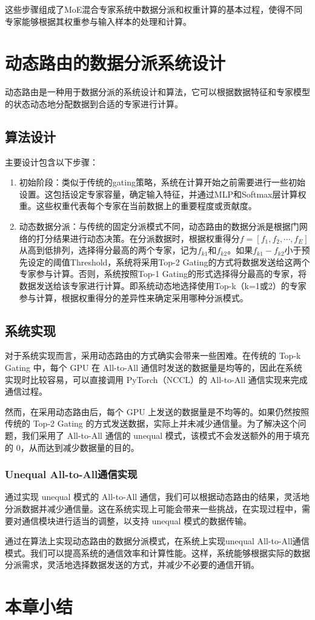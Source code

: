 这些步骤组成了MoE混合专家系统中数据分派和权重计算的基本过程，使得不同专家能够根据其权重参与输入样本的处理和计算。

\section{动态路由的数据分派系统设计}

动态路由是一种用于数据分派的系统设计和算法，它可以根据数据特征和专家模型的状态动态地分配数据到合适的专家进行计算。

\subsection{算法设计}
主要设计包含以下步骤：
\begin{enumerate}
    \item 初始阶段：类似于传统的gating策略，系统在计算开始之前需要进行一些初始设置。这包括设定专家容量，确定输入特征，并通过MLP和Softmax层计算权重。这些权重代表每个专家在当前数据上的重要程度或贡献度。
    \item 动态数据分派：与传统的固定分派模式不同，动态路由的数据分派是根据门网络的打分结果进行动态决策。在分派数据时，根据权重得分$f=[f_1, f_2, \cdots, f_E]$从高到低排列，选择得分最高的两个专家，记为$f_{k1}$和$f_{k2}$。如果$f_{k1} - f_{k2}$小于预先设定的阈值Threshold，系统将采用Top-2 Gating的方式将数据发送给这两个专家参与计算。否则，系统按照Top-1 Gating的形式选择得分最高的专家，将数据发送给该专家进行计算。即系统动态地选择使用Top-k（k=1或2）的专家参与计算，根据权重得分的差异性来确定采用哪种分派模式。
\end{enumerate}

\subsection{系统实现}

对于系统实现而言，采用动态路由的方式确实会带来一些困难。在传统的 Top-k Gating 中，每个 GPU 在 All-to-All 通信时发送的数据量是均等的，因此在系统实现时比较容易，可以直接调用 PyTorch（NCCL）的 All-to-All 通信实现来完成通信过程。

然而，在采用动态路由后，每个 GPU 上发送的数据量是不均等的。如果仍然按照传统的 Top-2 Gating 的方式发送数据，实际上并未减少通信量。为了解决这个问题，我们采用了 All-to-All 通信的 unequal 模式，该模式不会发送额外的用于填充的 0，从而达到减少数据量的目的。


\subsubsection{Unequal All-to-All通信实现}
通过实现 unequal 模式的 All-to-All 通信，我们可以根据动态路由的结果，灵活地分派数据并减少通信量。这在系统实现上可能会带来一些挑战，在实现过程中，需要对通信模块进行适当的调整，以支持 unequal 模式的数据传输。

通过在算法上实现动态路由的数据分派模式，在系统上实现unequal All-to-All通信模式。我们可以提高系统的通信效率和计算性能。这样，系统能够根据实际的数据分派需求，灵活地选择数据发送的方式，并减少不必要的通信开销。

\section{本章小结}

\endinput